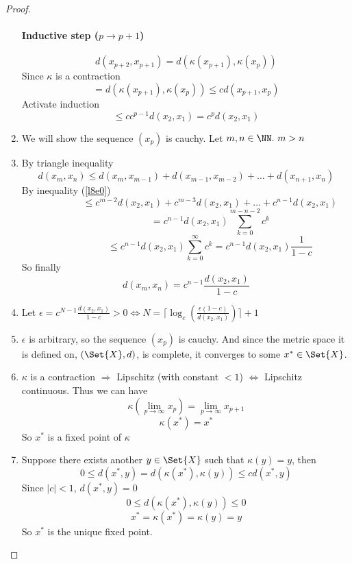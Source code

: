 \begin{proof}
\begin{enumerate}
    \paragraph{Inductive step ($p\to p+1$)}
    $$d(x_{p+2}, x_{p+1}) = d(\kappa(x_{p+1}), \kappa(x_{p}))$$
    Since $\kappa$ is a contraction
    $$ = d(\kappa(x_{p+1}), \kappa(x_p)) \leq cd(x_{p+1}, x_p)$$
    Activate induction
    $$ \leq cc^{p-1}d(x_2, x_1) = c^pd(x_2, x_1)$$
  \item We will show the sequence $(x_p)$ is cauchy. Let $m, n \in \NN.\ m > n$
  \item By triangle inequality
    $$d(x_m, x_n) \leq d(x_m, x_{m-1}) + d(x_{m-1}, x_{m-2}) + \dots + d(x_{n+1}, x_n)$$
    By inequality (\ref{l8e0})
    $$\phantom{d(x_m, x_n) } \leq c^{m-2}d(x_2, x_1)+c^{m-3}d(x_2, x_1)+\dots + c^{n-1}d(x_2, x_1)$$
    $$\phantom{d(x_m, x_n) } = c^{n-1}d(x_2, x_1)\sum_{k=0}^{m-n-2}c^k$$
    $$\phantom{d(x_m, x_n) } \leq c^{n-1}d(x_2, x_1)\sum_{k=0}^{\infty}c^k = c^{n-1}d(x_2, x_1)\frac{1}{1-c}$$
    So finally
    $$d(x_m, x_n) = c^{n-1}\frac{d(x_2, x_1)}{1-c}$$
  \item Let $\epsilon = c^{N-1}\frac{d(x_2, x_1)}{1-c} > 0 \Leftrightarrow N = \lceil \log_c(\frac{\epsilon(1-c)}{d(x_2, x_1)})\rceil + 1$
  \item $\epsilon$ is arbitrary, so the sequence $(x_p)$ is cauchy. And since the metric space it is defined on, $(\Set{X}, d)$, is complete, it converges to some $x^* \in \Set{X}$.
  \item $\kappa$ is a contraction $\Rightarrow$ Lipschitz (with constant $< 1$) $\Leftrightarrow$ Lipschitz continuous. Thus we can have
    $$\kappa(\lim_{p\rightarrow \infty}x_p) = \lim_{p\rightarrow \infty}x_{p+1}$$
    $$\kappa(x^*) = x^*$$
    So $x^*$ is a fixed point of $\kappa$
  \item Suppose there exists another $y \in \Set{X}$ such that $\kappa(y) = y$, then
    $$0 \leq d(x^*, y) = d(\kappa(x^*), \kappa(y)) \leq cd(x^*, y)$$
    Since $|c| < 1$, $d(x^*, y) = 0$
    $$0 \leq d(\kappa(x^*), \kappa(y)) \leq 0$$
    $$x^* = \kappa(x^*) = \kappa(y) = y$$
    So $x^*$ is the unique fixed point.
  \end{enumerate}
\end{proof}


